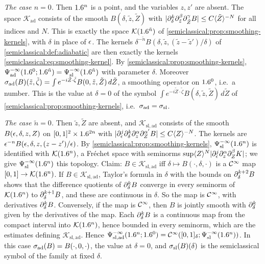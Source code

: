 \subsection*{}
\emph{The case $n=0$.} Then $1.6^n$ is a point, and the variables $z,z'$ are absent. The
space $\mathcal K_{\mathrm{ad}}$ consists of the smooth $B(\delta,\tilde z,\tilde Z)$ with
$\lvert \partial^k_\delta\partial^\beta_{\tilde z}\partial^\gamma_{\tilde Z}B\rvert\le C\langle \tilde Z\rangle^{-N}$ for all indices and $N$. This is
exactly the space $\mathcal K(1.6^{\tilde n})$ of \cref{semiclassical:prop:smoothing-kernels}, with
$\delta$ in place of $\epsilon$. The kernels $\delta^{-\tilde n}B(\delta,\tilde z,(\tilde z-\tilde z')/\delta)$ of
\cref{semiclassical:def:adiabatic} are then exactly the kernels
\eqref{semiclassical:eq:smoothing-kernel}. By \cref{semiclassical:prop:smoothing-kernels},
$\Psi^{-\infty}_{\mathrm{ad}}(1.6^0;1.6^{\tilde n})=\Psi^{-\infty}_{\mathrm{sl}}(1.6^{\tilde n})$ with parameter $\delta$. Moreover
$\sigma_{\mathrm{ad}}(B)(\tilde z,\tilde\zeta)=\int e^{-i\tilde Z\cdot\tilde\zeta}B(0,\tilde z,\tilde Z)\,d\tilde Z$, a smoothing
operator on $1.6^0$, i.e.\ a number. This is the value at $\delta=0$ of the symbol
$\int e^{-i\tilde Z\cdot\tilde\zeta}B(\delta,\tilde z,\tilde Z)\,d\tilde Z$ of
\cref{semiclassical:prop:smoothing-kernels}, i.e.\ $\sigma_{\mathrm{ad}}=\sigma_{\mathrm{sl}}$.

\emph{The case $\tilde n=0$.} Then $\tilde z,\tilde Z$ are absent, and $\mathcal K_{\mathrm{sl,ad}}$ consists of
the smooth $B(\epsilon,\delta,z,Z)$ on $[0,1]^2\times1.6^{2n}$ with
$\lvert \partial^j_\epsilon\partial^k_\delta\partial^\alpha_z\partial^{\alpha'}_ZB\rvert\le C\langle Z\rangle^{-N}$. The kernels are $\epsilon^{-n}B(\epsilon,\delta,z,(z-z')/\epsilon)$. By
\cref{semiclassical:prop:smoothing-kernels}, $\Psi^{-\infty}_{\mathrm{sl}}(1.6^n)$ is identified with
$\mathcal K(1.6^n)$, a Fr\'echet space with seminorms $\sup\langle Z\rangle^N\lvert \partial^j_\epsilon\partial^\alpha_z\partial^\beta_ZK\rvert$; we
give $\Psi^{-\infty}_{\mathrm{sl}}(1.6^n)$ this topology. Claim: $B\in\mathcal K_{\mathrm{sl,ad}}$ iff
$\delta\mapsto B(\cdot,\delta,\cdot)$ is a $\mathcal{C}^\infty$ map $[0,1]\to\mathcal K(1.6^n)$. If $B\in\mathcal K_{\mathrm{sl,ad}}$,
Taylor's formula in $\delta$ with the bounds on $\partial^{k+2}_\delta B$ shows that the difference
quotients of $\partial^k_\delta B$ converge in every seminorm of $\mathcal K(1.6^n)$ to $\partial^{k+1}_\delta B$, and
these are continuous in $\delta$. So the map is $\mathcal{C}^\infty$, with derivatives $\partial^k_\delta B$. Conversely,
if the map is $\mathcal{C}^\infty$, then $B$ is jointly smooth with $\partial^k_\delta$ given by the derivatives of the
map. Each $\partial^k_\delta B$ is a continuous map from the compact interval into
$\mathcal K(1.6^n)$, hence bounded in every seminorm, which are the estimates defining
$\mathcal K_{\mathrm{sl,ad}}$. Hence $\Psi^{-\infty}_{\mathrm{sl,ad}}(1.6^n;1.6^0)=\mathcal{C}^\infty([0,1]_\delta;\Psi^{-\infty}_{\mathrm{sl}}(1.6^n))$. In this
case $\sigma_{\mathrm{ad}}(B)=B(\cdot,0,\cdot)$, the value at $\delta=0$, and $\sigma_{\mathrm{sl}}(B)(\delta)$ is the semiclassical
symbol of the family at fixed $\delta$.

